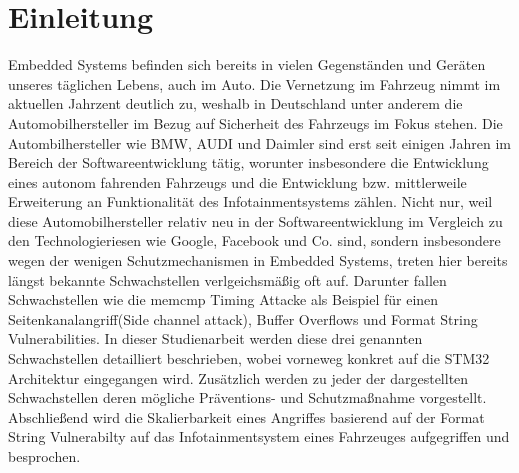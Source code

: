 \documentclass[a4paper,
DIV=13,
12pt,
BCOR=10mm,
department=FakIM,
oneside,
parskip=half,
automark,
listof=totocnumbered,
bibliography=totocnumbered,
acronym=totocnumbered
] {OTHRartcl}
\begin{document}
\section{Einleitung}
Embedded Systems befinden sich bereits in vielen Gegenständen und Geräten unseres täglichen Lebens, auch im Auto.
Die Vernetzung im Fahrzeug nimmt im aktuellen Jahrzent deutlich zu, weshalb in Deutschland unter anderem die Automobilhersteller im Bezug auf Sicherheit des Fahrzeugs im Fokus stehen.
Die Autombilhersteller wie BMW, AUDI und Daimler sind erst seit einigen Jahren im Bereich der Softwareentwicklung tätig, worunter insbesondere die Entwicklung eines autonom fahrenden Fahrzeugs und die Entwicklung
bzw. mittlerweile Erweiterung an Funktionalität des Infotainmentsystems zählen. Nicht nur, weil diese Automobilhersteller relativ neu in der Softwareentwicklung im Vergleich zu den Technologieriesen wie Google, Facebook und Co.
sind, sondern insbesondere wegen der wenigen Schutzmechanismen in Embedded Systems, treten hier bereits längst bekannte Schwachstellen verlgeichsmäßig oft auf.
Darunter fallen Schwachstellen wie die memcmp Timing Attacke als Beispiel für einen Seitenkanalangriff(Side channel attack), Buffer Overflows und Format String Vulnerabilities.
In dieser Studienarbeit werden diese drei genannten Schwachstellen detailliert beschrieben, wobei vorneweg konkret auf die STM32 Architektur eingegangen wird.
Zusätzlich werden zu jeder der dargestellten Schwachstellen deren mögliche Präventions- und Schutzmaßnahme vorgestellt.
Abschließend wird die Skalierbarkeit eines Angriffes basierend auf der Format String Vulnerabilty auf das Infotainmentsystem eines Fahrzeuges aufgegriffen und besprochen.
\end{document}
